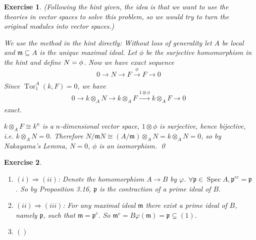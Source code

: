 \documentclass{article}
\theoremstyle{breakstyle}
\newtheorem{exercise}{Exercise}
\let\ker\relax
\DeclareMathOperator{\ker}{Ker}
\DeclareMathOperator{\spec}{Spec}
\DeclareMathOperator{\tor}{Tor}
\begin{document}
\begin{exercise}
    \emph{(Following the hint given,
    the idea is that we want to use the theories in vector spaces to solve this problem,
so we would try to turn the original modules into vector spaces.)}

    We use the method in the hint directly:
    Without loss of generality let $A$ be local and $\mathfrak{m}\subseteq A$ is the unique maximal ideal.
    Let $\phi$ be the surjective homomorphism in the hint and define $N=\ker{\phi}$.
    Now we have exact sequence
    $$
    0\longrightarrow N\longrightarrow F\xrightarrow[]{\phi} F\longrightarrow 0
    $$
    Since $\tor_{1}^{A}(k,F)=0$, we have
    $$
    0\longrightarrow k\otimes _{A}N\longrightarrow k\otimes _{A}F\xrightarrow[]{1\otimes \phi} k\otimes _{A}F\longrightarrow 0
    $$
    exact.

    $k\otimes _{A}F\cong k^{n}$ is a $n$-dimensional vector space, $1\otimes \phi$ is surjective, hence bijective, i.e. $k\otimes _{A}N=0$.
    Therefore $N / \mathfrak{m}N\cong \left( A / \mathfrak{m} \right) \otimes _{A}N=k\otimes _{A}N=0$,
    so by \emph{Nakayama's Lemma}, $N=0$, $\phi$ is an isomorphism.
    \qed
\end{exercise}

\begin{exercise}
    \leavevmode \vspace{-\baselineskip}
    \begin{enumerate}[label=({\alph*})]
        \item $(i)\Rightarrow (ii)$:
            Denote the homomorphism $A\longrightarrow B$ by $\varphi$.
            $\forall \mathfrak{p}\in \spec{A},\mathfrak{p}^{ec} =\mathfrak{p}$.
            So by \emph{Proposition 3.16}, $\mathfrak{p}$ is the contraction of a prime ideal of $B$.
        \item $(ii)\Rightarrow (iii)$:
            For any maximal ideal $\mathfrak{m}$ there exist a prime ideal of $B$, namely $\mathfrak{p}$, such that $\mathfrak{m}=\mathfrak{p}^{c}$.
            So $\mathfrak{m}^{e}=B\varphi(\mathfrak{m})=\mathfrak{p}\subsetneq (1)$.
        \item $()$
    \end{enumerate}
\end{exercise}
\end{document}
